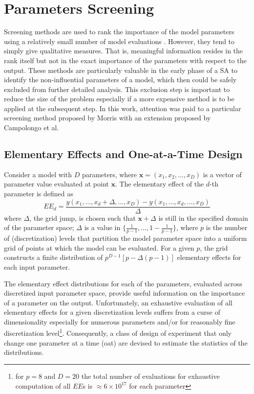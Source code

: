 \section{Parameters Screening}\label{sec:sa_parameters_screening}

Screening methods are used to rank the importance of the model parameters using a relatively small number of model evaluations \cite{Saltelli2004}.
However, they tend to simply give qualitative measures.
That is, meaningful information resides in the rank itself but not in the exact importance of the parameters with respect to the output. 
These methods are particularly valuable in the early phase of a SA to identify the non-influential parameters of a model,
which then could be safely excluded from further detailed analysis. 
This exclusion step is important to reduce the size of the problem especially if a more expensive method is to be applied at the subsequent step. 
In this work, attention was paid to a particular screening method proposed by Morris \cite{Morris1991} with an extension proposed by Campolongo et al. \cite{Campolongo2011}

\subsection{Elementary Effects and One-at-a-Time Design}

Consider a model with $D$ parameters, where $\mathbf{x} = (x_1, x_2, \dots,x_D)$ is a vector of parameter value evaluated at point $\mathbf{x}$.
The elementary effect of the $d$-th parameter is defined as
\begin{equation}
EE_d = \frac{y(x_1, \dots, x_d+\Delta,\dots,x_D) - y(x_1, \dots, x_d,\dots,x_D)}{\Delta}
\end{equation}
where $\Delta$, the grid jump, is chosen such that $\mathbf{x} + \Delta$ is still in the specified domain of the parameter space; $\Delta$ is a value in $\{\frac{1}{p-1}, \dots, 1 - \frac{1}{p-1}\}$, 
where $p$ is the number of (discretization) levels that partition the model parameter space into a uniform grid of points at which the model can be evaluated. 
For a given $p$, the grid constructs a finite distribution of $p^{D-1}[p - \Delta(p-1)]$ elementary effects for each input parameter.

The elementary effect distributions for each of the parameters, evaluated across discretized input parameter space, 
provide useful information on the importance of a parameter on the output.
Unfortunately, an exhaustive evaluation of all elementary effects for a given discretization levels suffers from a curse of dimensionality especially for numerous parameters and/or for reasonably fine discretization level\footnote{for $p = 8$ and $D = 20$ the total number of evaluations for exhaustive computation of all $EE$s is $\approx 6 \times 10^{17}$ for each parameter}.
Consequently, a class of design of experiment that only change one parameter at a time (\gls{oat}) are devised to estimate the statistics of the distributions.
  
